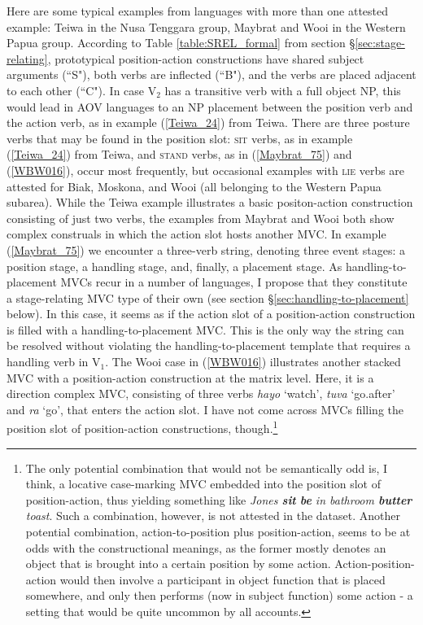 Here are some typical examples from languages with more than one attested example: Teiwa in the Nusa Tenggara group, Maybrat and Wooi in the Western Papua group. According to Table \ref{table:SREL_formal} from section §\ref{sec:stage-relating}, prototypical position-action constructions have shared subject arguments (``S"), both verbs are inflected (``B"), and the verbs are placed adjacent to each other (``C"). In case V$_2$ has a transitive verb with a full object NP, this would lead in AOV languages to an NP placement between the position verb and the action verb, as in example (\ref{Teiwa_24}) from Teiwa. There are three posture verbs that may be found in the position slot: \textsc{sit} verbs, as in example (\ref{Teiwa_24}) from Teiwa, and \textsc{stand} verbs, as in (\ref{Maybrat_75}) and (\ref{WBW016}), occur most frequently, but occasional examples with \textsc{lie} verbs are attested for Biak, Moskona, and Wooi (all belonging to the Western Papua subarea). While the Teiwa example illustrates a basic positon-action construction consisting of just two verbs, the examples from Maybrat and Wooi both show complex construals in which the action slot hosts another MVC. In example (\ref{Maybrat_75}) we encounter a three-verb string, denoting three event stages: a position stage, a handling stage, and, finally, a placement stage. As handling-to-placement MVCs recur in a number of languages, I propose that they constitute a stage-relating MVC type of their own (see section §\ref{sec:handling-to-placement} below). In this case, it seems as if the action slot of a position-action construction is filled with a handling-to-placement MVC. This is the only way the string can be resolved without violating the handling-to-placement template that requires a handling verb in V$_1$. The Wooi case in (\ref{WBW016}) illustrates another stacked MVC with a position-action construction at the matrix level. Here, it is a direction complex MVC, consisting of three verbs \textit{hayo} `watch', \textit{tuva} `go.after' and \textit{ra} `go', that enters the action slot. I have not come across MVCs filling the position slot of position-action constructions, though.\footnote{The only potential combination that would not be semantically odd is, I think, a locative case-marking MVC embedded into the position slot of position-action, thus yielding something like \textit{Jones \textbf{sit} \textbf{be} in bathroom \textbf{butter} toast}. Such a combination, however, is not attested in the dataset. Another potential combination, action-to-position plus position-action, seems to be at odds with the constructional meanings, as the former mostly denotes an object that is brought into a certain position by some action. Action-position-action would then involve a participant in object function that is placed somewhere, and only then performs (now in subject function) some action - a setting that would be quite uncommon by all accounts.}


